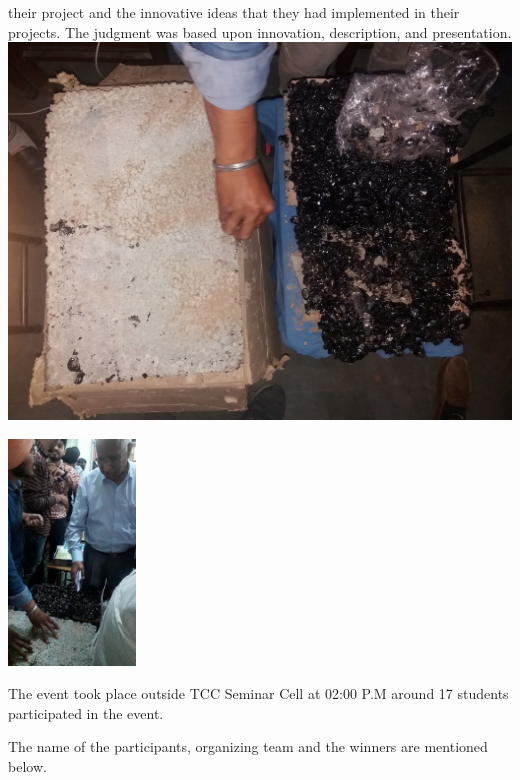 \documentclass[12pt, a4 paper]{article}
\begin{document}
\begin{center}
\begin{Large}
\begin{multicols}{2}
\justify
their project and the innovative ideas that they had implemented in their projects. The judgment was based upon innovation, description, and presentation.
\columnbreak
\includegraphics[width=\linewidth]{image4.jpeg}
  
\end{multicols}

\begin{multicols}{2}
\includegraphics[width=\linewidth,height=6cm]{image9.jpeg}

\columnbreak
\justify
The event took place 
outside TCC Seminar Cell at 02:00 P.M around 17 
students participated in the event.
  
\end{multicols} 

\begin{multicols}{2}
\justify
The name of the participants, organizing team and the winners are mentioned below.


\end{multicols}
\end{Large}
\end{center}
\end{document}
